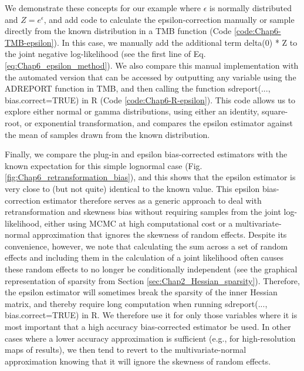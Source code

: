 We demonstrate these concepts for our example where \(\epsilon\) is normally distributed and \( Z=e^{\epsilon}\), and add code to calculate the epsilon-correction manually or sample directly from the known distribution in a TMB function (Code \ref{code:Chap6-TMB-epsilon}).  In this case, we manually add the additional term \colorbox{backblue}{delta(0) * Z} to the joint negative log-likelihood (see the first line of Eq. \ref{eq:Chap6_epsilon_method}).  We also compare this manual implementation with the automated version that can be accessed by outputting any variable using the \colorbox{backblue}{ADREPORT} function in TMB, and then calling the function \colorbox{backcolour}{sdreport(..., bias.correct=TRUE)} in R (Code \ref{code:Chap6-R-epsilon}).  This code allows us to explore either normal or gamma distributions, using either an identity, square-root, or exponential transformation, and compares the epsilon estimator against the mean of samples drawn from the known distribution. 

\lstset{style=TMBcode}


\lstset{style=Rcode}


Finally, we compare the plug-in and epsilon bias-corrected estimators with the known expectation for this simple lognormal case (Fig. \ref{fig:Chap6_retransformation_bias}), and this shows that the epsilon estimator is very close to (but not quite) identical to the known value.  This epsilon bias-correction estimator therefore serves as a generic approach to deal with retransformation and skewness bias without requiring samples from the joint log-likelihood, either using MCMC at high computational cost or a multivariate-normal approximation that ignores the skewness of random effects.  Despite its convenience, however, we note that calculating the sum across a set of random effects and including them in the calculation of a joint likelihood often causes these random effects to no longer be conditionally independent (see the graphical representation of sparsity from Section \ref{sec:Chap2_Hessian_sparsity}).  Therefore, the epsilon estimator will sometimes break the sparsity of the inner Hessian matrix, and thereby require long computation when running \colorbox{backcolour}{sdreport(..., bias.correct=TRUE)} in R.  We therefore use it for only those variables where it is most important that a high accuracy bias-corrected estimator be used. In other cases where a lower accuracy approximation is sufficient (e.g., for high-resolution maps of results), we then tend to revert to the multivariate-normal approximation knowing that it will ignore the skewness of random effects.   

